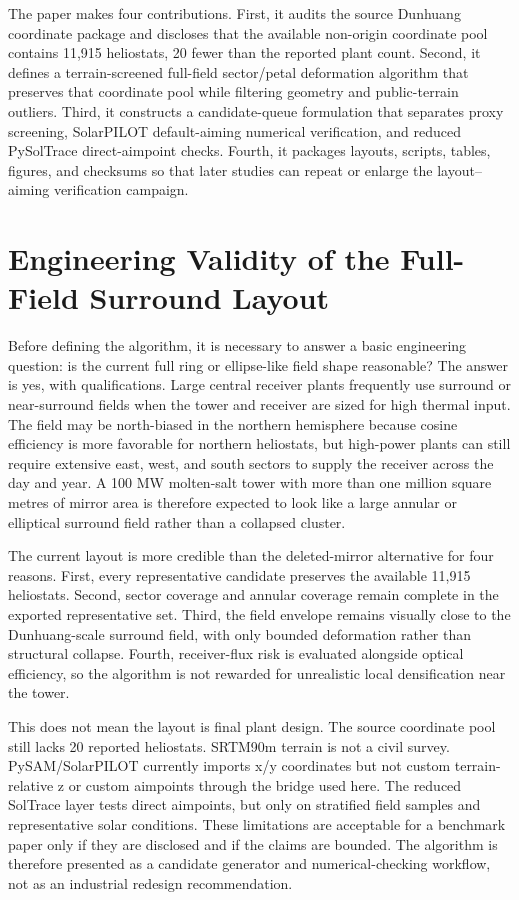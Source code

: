 \documentclass[final,3p,times]{elsarticle}
\begin{document}
The paper makes four contributions. First, it audits the source Dunhuang coordinate package and discloses that the available non-origin coordinate pool contains 11,915 heliostats, 20 fewer than the reported plant count. Second, it defines a terrain-screened full-field sector/petal deformation algorithm that preserves that coordinate pool while filtering geometry and public-terrain outliers. Third, it constructs a candidate-queue formulation that separates proxy screening, SolarPILOT default-aiming numerical verification, and reduced PySolTrace direct-aimpoint checks. Fourth, it packages layouts, scripts, tables, figures, and checksums so that later studies can repeat or enlarge the layout--aiming verification campaign.

\section{Engineering Validity of the Full-Field Surround Layout}
Before defining the algorithm, it is necessary to answer a basic engineering question: is the current full ring or ellipse-like field shape reasonable? The answer is yes, with qualifications. Large central receiver plants frequently use surround or near-surround fields when the tower and receiver are sized for high thermal input. The field may be north-biased in the northern hemisphere because cosine efficiency is more favorable for northern heliostats, but high-power plants can still require extensive east, west, and south sectors to supply the receiver across the day and year. A 100 MW molten-salt tower with more than one million square metres of mirror area is therefore expected to look like a large annular or elliptical surround field rather than a collapsed cluster.

The current layout is more credible than the deleted-mirror alternative for four reasons. First, every representative candidate preserves the available 11,915 heliostats. Second, sector coverage and annular coverage remain complete in the exported representative set. Third, the field envelope remains visually close to the Dunhuang-scale surround field, with only bounded deformation rather than structural collapse. Fourth, receiver-flux risk is evaluated alongside optical efficiency, so the algorithm is not rewarded for unrealistic local densification near the tower.

This does not mean the layout is final plant design. The source coordinate pool still lacks 20 reported heliostats. SRTM90m terrain is not a civil survey. PySAM/SolarPILOT currently imports x/y coordinates but not custom terrain-relative z or custom aimpoints through the bridge used here. The reduced SolTrace layer tests direct aimpoints, but only on stratified field samples and representative solar conditions. These limitations are acceptable for a benchmark paper only if they are disclosed and if the claims are bounded. The algorithm is therefore presented as a candidate generator and numerical-checking workflow, not as an industrial redesign recommendation.
\end{document}
